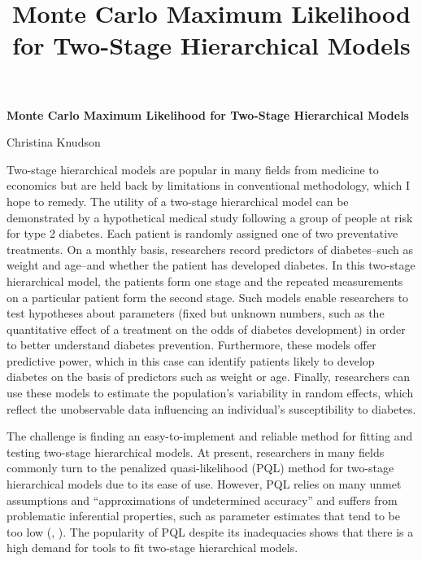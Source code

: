\documentclass[12pt]{article}
\title{Monte Carlo Maximum Likelihood for Two-Stage Hierarchical Models}
\author{}
\date{}
\newcommand{\ncite}[1]{\citeauthor{#1}, \citeyear{#1}}
\begin{document}
 \centerline{\large \bf Monte Carlo Maximum Likelihood for Two-Stage Hierarchical Models} %

 \medskip

 \centerline{Christina Knudson}
 \smallskip

Two-stage hierarchical models are popular in many fields from medicine to economics but are held back by limitations in conventional methodology, which I hope to remedy. The utility of a two-stage hierarchical model can be demonstrated by a hypothetical medical study following a group of people at risk for type 2 diabetes. Each patient is randomly assigned one of two preventative treatments. On a monthly basis, researchers record predictors of diabetes--such as weight and age--and whether the patient has developed diabetes. In this two-stage hierarchical model, the patients form one stage and the repeated measurements on a particular patient form the second stage. Such models enable researchers to test hypotheses about parameters (fixed but unknown numbers, such as the quantitative effect of a treatment on the odds of diabetes development) in order to better understand diabetes prevention. Furthermore, these models offer predictive power, which in this case can identify patients likely to develop diabetes on the basis of predictors such as weight or age. Finally, researchers can use these models to estimate the population's variability in random effects, which reflect the unobservable data influencing an individual's susceptibility to diabetes.

The challenge is finding an easy-to-implement and reliable method for fitting and testing two-stage hierarchical models. At present, researchers in many fields commonly turn to the penalized quasi-likelihood (PQL) method for two-stage hierarchical models due to its ease of use. However, PQL relies on many unmet assumptions and ``approximations of undetermined accuracy'' and suffers from problematic inferential properties, such as parameter estimates that tend to be too low (\ncite{mccu:sear:2001}). The popularity of PQL despite its inadequacies shows that there is a high demand for tools to fit two-stage hierarchical models.
\end{document}
